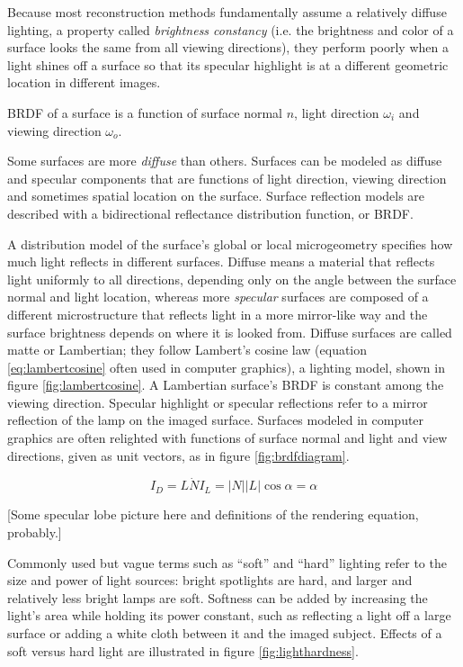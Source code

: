 Because most reconstruction methods fundamentally assume a relatively diffuse lighting, a property called \emph{brightness constancy} (i.e. the brightness and color of a surface looks the same from all viewing directions), they perform poorly when a light shines off a surface so that its specular highlight is at a different geometric location in different images.

{BRDF of a surface is a function of surface normal $n$, light direction $\omega_i$ and viewing direction $\omega_o$.}

Some surfaces are more \emph{diffuse} than others.
Surfaces can be modeled as diffuse and specular components that are functions of light direction, viewing direction and sometimes spatial location on the surface.
Surface reflection models are described with a bidirectional reflectance distribution function, or BRDF. \cite{nicodemus1965dirreflectanceetc}

A distribution model of the surface's global or local microgeometry specifies how much light reflects in different surfaces. \cite{nayar1991surface} %
Diffuse means a material that reflects light uniformly to all directions, depending only on the angle between the surface normal and light location, whereas more \emph{specular} surfaces are composed of a different microstructure that reflects light in a more mirror-like way and the surface brightness depends on where it is looked from.
Diffuse surfaces are called matte or Lambertian; they follow Lambert's cosine law (equation \ref{eq:lambertcosine} often used in computer graphics), a lighting model, shown in figure \ref{fig:lambertcosine}. \cite{lamberttodo}
A Lambertian surface's BRDF is constant among the viewing direction.
Specular highlight or specular reflections refer to a mirror reflection of the lamp on the imaged surface.
Surfaces modeled in computer graphics are often relighted with functions of surface normal and light and view directions, given as unit vectors, as in figure \ref{fig:brdfdiagram}.


\begin{equation} \label{eq:lambertcosine}
	I_D = L \dot N I_L = |N| |L| \cos \alpha = \alpha
\end{equation}

[Some specular lobe picture here and definitions of the rendering equation, probably.]

Commonly used but vague terms such as ``soft'' and ``hard'' lighting refer to the size and power of light sources: bright spotlights are hard, and larger and relatively less bright lamps are soft.
Softness can be added by increasing the light's area while holding its power constant, such as reflecting a light off a large surface or adding a white cloth between it and the imaged subject.
Effects of a soft versus hard light are illustrated in figure \ref{fig:lighthardness}.

